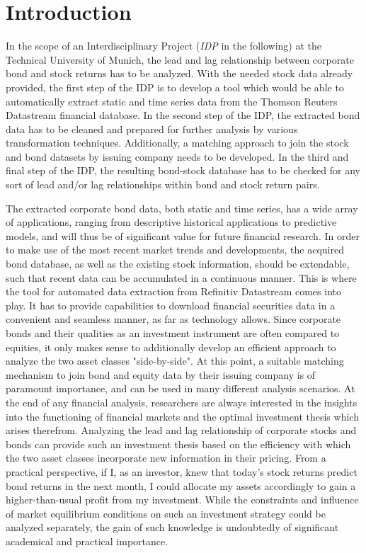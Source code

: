 \chapter{Introduction} \label{chapter:Introduction}
In the scope of an Interdisciplinary Project (\textit{IDP} in the following) at the Technical University of Munich, the lead and lag relationship between corporate bond and stock returns has to be analyzed. With the needed stock data already provided, the first step of the IDP is to develop a tool which would be able to automatically extract static and time series data from the Thomson Reuters Datastream financial database. In the second step of the IDP, the extracted bond data has to be cleaned and prepared for further analysis by various transformation techniques. Additionally, a matching approach to join the stock and bond datasets by issuing company needs to be developed. In the third and final step of the IDP, the resulting bond-stock database has to be checked for any sort of lead and/or lag relationships within bond and stock return pairs. 

The extracted corporate bond data, both static and time series, has a wide array of applications, ranging from descriptive historical applications to predictive models, and will thus be of significant value for future financial research. In order to make use of the most recent market trends and developments, the acquired bond database, as well as the existing stock information, should be extendable, such that recent data can be accumulated in a continuous manner. This is where the tool for automated data extraction from Refinitiv Datastream comes into play. It has to provide capabilities to download financial securities data in a convenient and seamless manner, as far as technology allows. Since corporate bonds and their qualities as an investment instrument are often compared to equities, it only makes sense to additionally develop an efficient approach to analyze the two asset classes "side-by-side". At this point, a suitable matching mechanism to join bond and equity data by their issuing company is of paramount importance, and can be used in many different analysis scenarios. At the end of any financial analysis, researchers are always interested in the insights into the functioning of financial markets and the optimal investment thesis which arises therefrom. Analyzing the lead and lag relationship of corporate stocks and bonds can provide such an investment thesis based on the efficiency with which the two asset classes incorporate new information in their pricing. From a practical perspective, if I, as an investor, knew that today's stock returns predict bond returns in the next month, I could allocate my assets accordingly to gain a higher-than-usual profit from my investment. While the constraints and influence of market equilibrium conditions on such an investment strategy could be analyzed separately, the gain of such knowledge is undoubtedly of significant academical and practical importance. 



